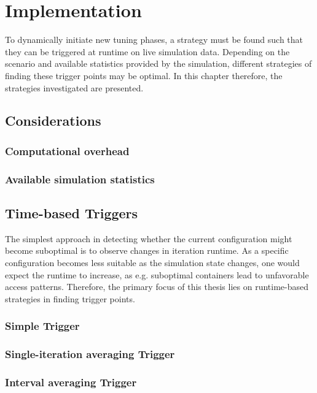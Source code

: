 \chapter[Implementation]{Implementation}
\label{cp:implementation}

{
\parindent0pt
To dynamically initiate new tuning phases, a strategy must be found such that they can be triggered at runtime on live simulation data. Depending on the scenario and available statistics provided by the simulation, different strategies of finding these trigger points may be optimal. In this chapter therefore, the strategies investigated are presented.
}

\section{Considerations}
\subsection{Computational overhead}
\subsection{Available simulation statistics}

\section{Time-based Triggers}

The simplest approach in detecting whether the current configuration might become suboptimal is to observe changes in iteration runtime. As a specific configuration becomes less suitable as the simulation state changes, one would expect the runtime to increase, as e.g. suboptimal containers lead to unfavorable access patterns. Therefore, the primary focus of this thesis lies on runtime-based strategies in finding trigger points.

\subsection{Simple Trigger}

\subsection{Single-iteration averaging Trigger}

\subsection{Interval averaging Trigger}

